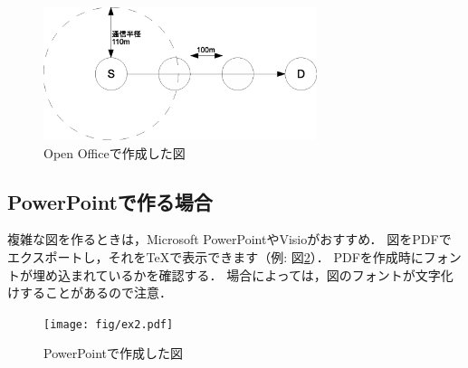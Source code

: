 \documentclass[submit,techreq,noauthor]{eco}	%
\begin{document}
\begin{figure}[t]
    \centering
    \includegraphics[width=8cm]{fig/ex1.eps}
    \caption{Open Officeで作成した図}
    \label{fig:tgif-sample}
\end{figure}


\subsection{PowerPointで作る場合}
複雑な図を作るときは，Microsoft PowerPointやVisioがおすすめ．
図をPDFでエクスポートし，それをTeXで表示できます（例: 図\ref{fig:pdf-sample}）．
PDFを作成時にフォントが埋め込まれているかを確認する．
場合によっては，図のフォントが文字化けすることがあるので注意．

\begin{figure}[t]
    \centering
    \texttt{[image: fig/ex2.pdf]}
    \caption{PowerPointで作成した図}
    \label{fig:pdf-sample}
\end{figure}



\setlength\baselineskip{12pt}
{\small
  
  
}
\end{document}
